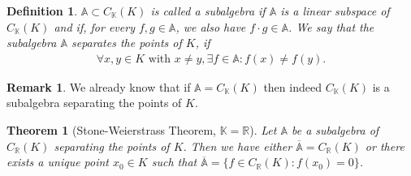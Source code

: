 \documentclass[11pt,a4paper]{article}
\newtheorem{thm}{Theorem}[section]
\newtheorem{defn}{Definition}[section]
\theoremstyle{definition}
\newtheorem{rem}{Remark}[section]
\begin{document}
\newpage
\begin{defn} $\mathbb{A} \subset C_\mathbb{K}(K)$ is called a subalgebra if $\mathbb{A}$ is a linear subspace of $C_\mathbb{K}(K)$ and if, for every $f,g \in \mathbb{A}$, we also have $f \cdot g \in \mathbb{A}$. We say that the subalgebra $\mathbb{A}$ separates the points of $K$, if 
\begin{align*}
\forall x,y \in K \text{ with } x \neq y, \exists f \in \mathbb{A} : f(x) \neq f(y). 
\end{align*}
\end{defn}
\begin{rem} We already know that if $\mathbb{A}= C_\mathbb{K}(K)$ then indeed $C_\mathbb{K}(K)$ is a subalgebra separating the points of $K$. 
\end{rem}
\begin{thm}[Stone-Weierstrass Theorem, $\mathbb{K}= \mathbb{R}$] Let $\mathbb{A}$ be a subalgebra of $C_\mathbb{R}(K)$ separating the points of $K$. Then we have either $\overline{\mathbb{A}}= C_\mathbb{R}(K)$ or there exists a unique point $x_0 \in K$ such that $\overline{\mathbb{A}}= \lbrace f \in C_\mathbb{R}(K) : f(x_0)=0 \rbrace$. 
\end{thm}
\end{document}
